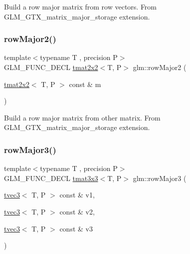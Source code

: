 Build a row major matrix from row vectors. From G\+L\+M\+\_\+\+G\+T\+X\+\_\+matrix\+\_\+major\+\_\+storage extension. \mbox{\label{group__gtx__matrix__major__storage_ga42a006aa66198452bd3c89415f892196}} 
\subsubsection{\texorpdfstring{row\+Major2()}{rowMajor2()}\hspace{0.1cm}{\footnotesize\ttfamily [2/2]}}
{\footnotesize\ttfamily template$<$typename T , precision P$>$ \\
G\+L\+M\+\_\+\+F\+U\+N\+C\+\_\+\+D\+E\+CL \hyperlink{structglm_1_1tmat2x2}{tmat2x2}$<$T, P$>$ glm\+::row\+Major2 (\begin{DoxyParamCaption}\item[{\hyperlink{structglm_1_1tmat2x2}{tmat2x2}$<$ T, P $>$ const \&}]{m }\end{DoxyParamCaption})}

Build a row major matrix from other matrix. From G\+L\+M\+\_\+\+G\+T\+X\+\_\+matrix\+\_\+major\+\_\+storage extension. \mbox{\label{group__gtx__matrix__major__storage_gaba4de9afc4e65ec8ea0403e7cba3fb9f}} 
\subsubsection{\texorpdfstring{row\+Major3()}{rowMajor3()}\hspace{0.1cm}{\footnotesize\ttfamily [1/2]}}
{\footnotesize\ttfamily template$<$typename T , precision P$>$ \\
G\+L\+M\+\_\+\+F\+U\+N\+C\+\_\+\+D\+E\+CL \hyperlink{structglm_1_1tmat3x3}{tmat3x3}$<$T, P$>$ glm\+::row\+Major3 (\begin{DoxyParamCaption}\item[{\hyperlink{structglm_1_1tvec3}{tvec3}$<$ T, P $>$ const \&}]{v1,  }\item[{\hyperlink{structglm_1_1tvec3}{tvec3}$<$ T, P $>$ const \&}]{v2,  }\item[{\hyperlink{structglm_1_1tvec3}{tvec3}$<$ T, P $>$ const \&}]{v3 }\end{DoxyParamCaption})}

